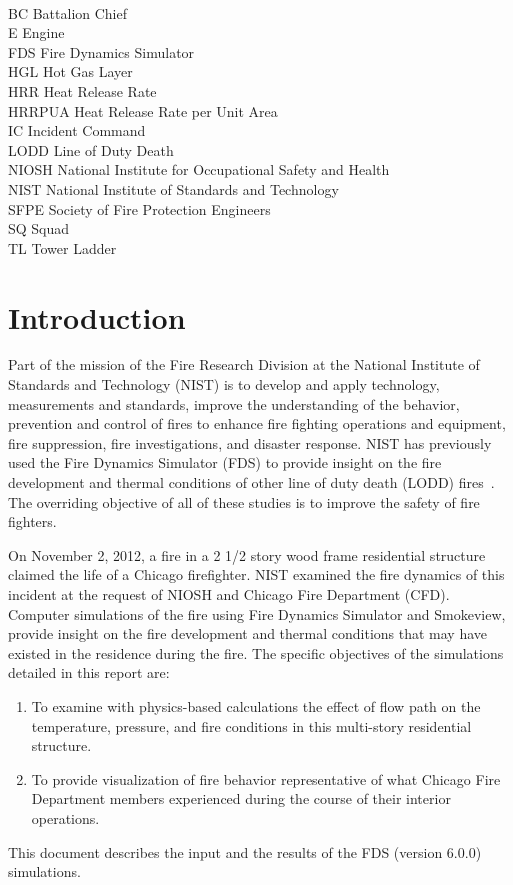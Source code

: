 \documentclass[11pt,oneside]{book}
\begin{document}
\begin{tabbing}
\hspace{1.5in} \= \\
BC \> Battalion Chief \\
E \> Engine \\
FDS \> Fire Dynamics Simulator \\
HGL \> Hot Gas Layer \\
HRR \> Heat Release Rate \\
HRRPUA \> Heat Release Rate per Unit Area \\
IC \> Incident Command \\
LODD \> Line of Duty Death \\
NIOSH \> National Institute for Occupational Safety and  Health \\
NIST \> National Institute of Standards and Technology \\
SFPE \> Society of Fire Protection Engineers \\
SQ \> Squad \\
TL \> Tower Ladder \\
\end{tabbing}

\mainmatter

\chapter{Introduction}
Part of the mission of the Fire Research Division at the National Institute of Standards and Technology (NIST) is to develop and apply technology, measurements and standards, improve the understanding of the behavior, prevention and control of fires to enhance fire fighting operations and equipment, fire suppression, fire investigations, and disaster response. NIST has previously used the Fire Dynamics Simulator (FDS) to provide insight on the fire development and thermal conditions of other line of duty death (LODD) fires~\cite{Madrzykowski:1,Iowa,Texas,Cook_County,Grosshandler:Station,Bryner:Charleston,barowy:texas}. The overriding objective of all of these studies is to improve the safety of fire fighters.

On November 2, 2012, a fire in a 2 1/2 story wood frame residential structure claimed the life of a Chicago firefighter. NIST examined the fire dynamics of this incident at the request of NIOSH and Chicago Fire Department (CFD). Computer simulations of the fire using Fire Dynamics Simulator and Smokeview, provide insight on the fire development and thermal conditions that may have existed in the residence during the fire. The specific objectives of the simulations detailed in this report are: 
\begin{enumerate}
\item To examine with physics-based calculations the effect of flow path on the temperature, pressure, and fire conditions in this multi-story residential structure.
\item To provide visualization of fire behavior representative of what Chicago Fire Department members experienced during the course of their interior operations.
\end{enumerate}
This document describes the input and the results of the FDS (version 6.0.0) simulations.
\end{document}
